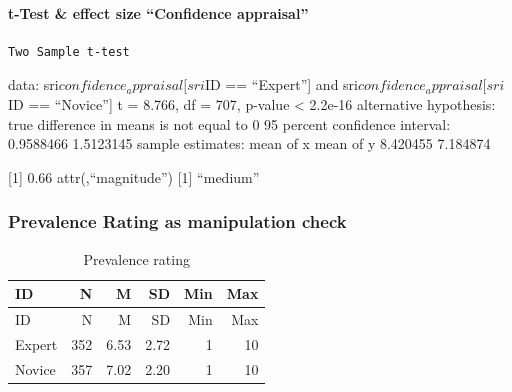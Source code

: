 \documentclass[
]{article}
\begin{document}
\paragraph{t-Test \& effect size ``Confidence
appraisal''}\label{t-test-effect-size-confidence-appraisal}

\begin{verbatim}
Two Sample t-test
\end{verbatim}

data: sri\(confidence_appraisal[sri\)ID == ``Expert''{]} and
sri\(confidence_appraisal[sri\)ID == ``Novice''{]} t = 8.766, df = 707,
p-value \textless{} 2.2e-16 alternative hypothesis: true difference in
means is not equal to 0 95 percent confidence interval: 0.9588466
1.5123145 sample estimates: mean of x mean of y 8.420455 7.184874

{[}1{]} 0.66 attr(,``magnitude'') {[}1{]} ``medium''

\subsubsection{Prevalence Rating as manipulation
check}\label{prevalence-rating-as-manipulation-check}

\begin{longtable}[]{@{}lrrrrr@{}}
\caption{Prevalence rating}\tabularnewline
\toprule\noalign{}
ID & N & M & SD & Min & Max \\
\midrule\noalign{}
\endfirsthead
\toprule\noalign{}
ID & N & M & SD & Min & Max \\
\midrule\noalign{}
\endhead
\bottomrule\noalign{}
\endlastfoot
Expert & 352 & 6.53 & 2.72 & 1 & 10 \\
Novice & 357 & 7.02 & 2.20 & 1 & 10 \\
\end{longtable}
\end{document}
